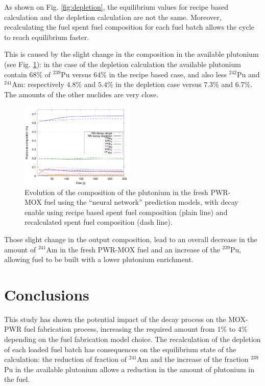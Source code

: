 \documentclass{anstrans}
\begin{document}
As shown on Fig. \ref{fig:depletion}, the equilibrium values for recipe based
calculation and the depletion calculation are not the same. Moreover,
recalculating the fuel spent fuel composition for each fuel batch allows the
cycle to reach equilibrium faster.

This is caused by the slight change in the composition in the available
plutonium (see Fig. \ref{fig:depletioncompo}): in the case of the depletion
calculation the available plutonium contain $68\%$ of $^{239}$Pu versus $64\%$
in the recipe based case, and also less $^{242}$Pu and $^{241}$Am: respectively
$4.8\%$ and $5.4\%$ in the depletion case versus $7.3\%$ and $6.7\%$. The
amounts of the other nuclides are very close.


\begin{figure}[ht] %
  \centering
  \includegraphics[width=0.48\textwidth]{MOX_pu_composition.png}
  \caption{Evolution of the composition of the plutonium in the fresh PWR-MOX fuel
  using the ``neural network'' prediction models, with decay enable using recipe
  based spent fuel composition (plain line) and recalculated spent fuel
  composition (dash line).}
  \label{fig:depletioncompo}
\end{figure}

Those slight change in the output composition, lead to an overall decrease in
the amount of $^{241}$Am in the fresh PWR-MOX fuel and an increase of the
$^{239}$Pu, allowing fuel to be built with a lower plutonium enrichment.


\section{Conclusions}

This study has shown the potential impact of the decay process on the MOX-PWR fuel
fabrication process, increasing the required amount from $1\%$ to $4\%$
depending on the fuel fabrication model choice. The recalculation of the 
depletion of each loaded fuel batch has consequences on the equilibrium
state of the calculation: the reduction of fraction of $^{241}$Am and the increase of the
fraction $^{239}$Pu in the available plutonium allows a reduction in the amount of
plutonium in the fuel.
\end{document}
